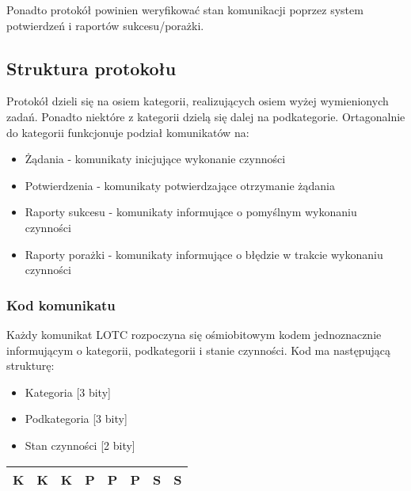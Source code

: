 \documentclass[10pt,a4paper]{article}
\begin{document}
		    Ponadto protokół powinien weryfikować stan komunikacji poprzez system potwierdzeń i raportów sukcesu/porażki.
		    
	    \subsection{Struktura protokołu}
	        Protokół dzieli się na osiem kategorii, realizujących osiem wyżej wymienionych zadań. Ponadto niektóre z kategorii dzielą się dalej na podkategorie. Ortagonalnie do kategorii funkcjonuje podział komunikatów na:
	        \begin{itemize}   
				\item Żądania - komunikaty inicjujące wykonanie czynności
				\item Potwierdzenia - komunikaty potwierdzające otrzymanie żądania
			    \item Raporty sukcesu - komunikaty informujące o pomyślnym wykonaniu czynności
				\item Raporty porażki - komunikaty informujące o błędzie w trakcie wykonaniu czynności
	        \end{itemize}
	        
	        \subsubsection{Kod komunikatu}
		        Każdy komunikat LOTC rozpoczyna się ośmiobitowym kodem jednoznacznie informującym o kategorii, podkategorii i stanie czynności. Kod ma następującą strukturę:
		         \begin{itemize}   
					\item Kategoria [3 bity]
					\item Podkategoria [3 bity]
				    \item Stan czynności [2 bity]
		        \end{itemize}
		        
		        \begin{center}
			        \begin{tabular}{ || c | c | c || c | c | c || c | c || }
			            \hline
					    K & K & K & P & P & P & S & S \\
					    \hline
					\end{tabular}  
		        \end{center}
		        
\end{document}
